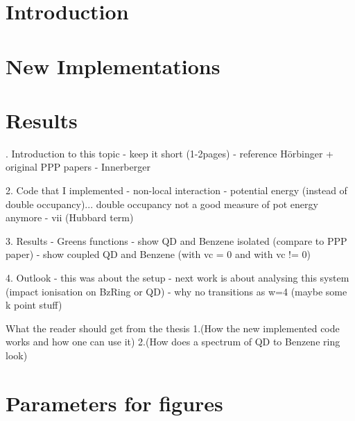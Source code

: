 \documentclass[oneside]{scrbook}			%
\begin{document}
\thispagestyle{empty} \clearpage										%
\pagestyle{plain}  %



\tableofcontents
\chapter{Introduction}




%
\chapter{New Implementations}





%
\chapter{Results}



. Introduction to this topic
    - keep it short (1-2pages)
    - reference Hörbinger + original PPP papers
    - Innerberger
    
 2. Code that I implemented
    - non-local interaction
    - potential energy (instead of double occupancy)... double occupancy not a good measure of pot energy anymore
    - vii (Hubbard term)

3. Results
    - Greens functions
    - show QD and Benzene isolated (compare to PPP paper)
    - show coupled QD and Benzene (with vc = 0 and with vc != 0)
    
4. Outlook
    - this was about the setup
    - next work is about analysing this system (impact ionisation on BzRing or QD)
    - why no transitions as w=4 (maybe some k point stuff)
    
What the reader should get from the thesis
1.(How the new implemented code works and how one can use it)
2.(How does a spectrum of QD to Benzene ring look)

\newpage
\chapter*{Parameters for figures}

\newpage



 

\newpage

\end{document}
